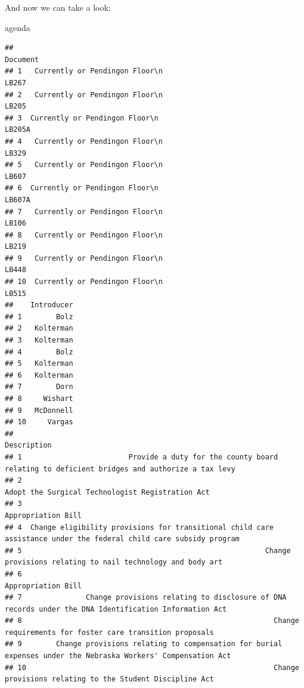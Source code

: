 \documentclass[]{book}
\newenvironment{Shaded}{\begin{snugshade}}{\end{snugshade}}
\newcommand{\NormalTok}[1]{#1}
\begin{document}
And now we can take a look:

\begin{Shaded}
\begin{Highlighting}[]
\NormalTok{agenda}
\end{Highlighting}
\end{Shaded}

\begin{verbatim}
##                                                                                                Document
## 1   Currently or Pendingon Floor\n                                                                LB267
## 2   Currently or Pendingon Floor\n                                                                LB205
## 3  Currently or Pendingon Floor\n                                                                LB205A
## 4   Currently or Pendingon Floor\n                                                                LB329
## 5   Currently or Pendingon Floor\n                                                                LB607
## 6  Currently or Pendingon Floor\n                                                                LB607A
## 7   Currently or Pendingon Floor\n                                                                LB106
## 8   Currently or Pendingon Floor\n                                                                LB219
## 9   Currently or Pendingon Floor\n                                                                LB448
## 10  Currently or Pendingon Floor\n                                                                LB515
##    Introducer
## 1        Bolz
## 2   Kolterman
## 3   Kolterman
## 4        Bolz
## 5   Kolterman
## 6   Kolterman
## 7        Dorn
## 8     Wishart
## 9   McDonnell
## 10     Vargas
##                                                                                                          Description
## 1                         Provide a duty for the county board relating to deficient bridges and authorize a tax levy
## 2                                                                   Adopt the Surgical Technologist Registration Act
## 3                                                                                                 Appropriation Bill
## 4  Change eligibility provisions for transitional child care assistance under the federal child care subsidy program
## 5                                                         Change provisions relating to nail technology and body art
## 6                                                                                                 Appropriation Bill
## 7               Change provisions relating to disclosure of DNA records under the DNA Identification Information Act
## 8                                                           Change requirements for foster care transition proposals
## 9        Change provisions relating to compensation for burial expenses under the Nebraska Workers' Compensation Act
## 10                                                          Change provisions relating to the Student Discipline Act
\end{verbatim}
\end{document}
